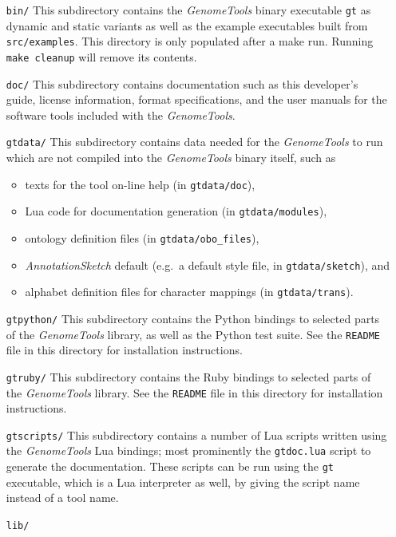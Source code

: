 \documentclass[11pt,final]{article}
\newcommand{\Gt}[0]{\emph{GenomeTools}\xspace}
\begin{document}
\begin{itemize}
\item[\texttt{bin/}] This subdirectory contains the \Gt binary executable \texttt{gt}
     as dynamic and static variants as well as the example executables built
     from \texttt{src/examples}. This directory is only populated after a
     make run. Running \texttt{make cleanup} will remove its contents.
\item[\texttt{doc/}] This subdirectory contains documentation such as this
     developer's guide, license information, format specifications, and the
     user manuals for the software tools included with the \Gt .
\item[\texttt{gtdata/}]
     This subdirectory contains data needed for the \Gt to run which are not
     compiled into the \Gt binary itself, such as
     \begin{itemize}
       \item texts for the tool on-line help (in \texttt{gtdata/doc}),
       \item Lua code for documentation generation (in \texttt{gtdata/modules}),
       \item ontology definition files (in \texttt{gtdata/obo\_files}),
       \item \emph{AnnotationSketch} default (e.g.\ a default style file, in
              \texttt{gtdata/sketch}), and
       \item alphabet definition files for character mappings
             (in \texttt{gtdata/trans}).
     \end{itemize}     
\item[\texttt{gtpython/}]
     This subdirectory contains the Python bindings to selected parts of the \Gt
     library, as well as the Python test suite. See the \texttt{README} file in
     this directory for installation instructions.
\item[\texttt{gtruby/}]
     This subdirectory contains the Ruby bindings to selected parts of the \Gt
     library. See the \texttt{README} file in this directory for installation
     instructions.
\item[\texttt{gtscripts/}]
     This subdirectory contains a number of Lua scripts written using the \Gt
     Lua bindings; most prominently the \texttt{gtdoc.lua} script to generate
     the documentation. These scripts can be run using the \texttt{gt}
     executable, which is a Lua interpreter as well, by giving the script name
     instead of a tool name.
\item[\texttt{lib/}]

\end{itemize}
\end{document}
